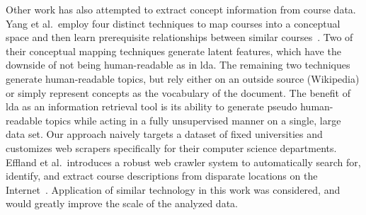 
Other work has also attempted to extract concept information from course data.
Yang et al.\ employ four distinct techniques to map courses into a conceptual space and then learn prerequisite relationships between similar courses~\cite{Yang2015}.
Two of their conceptual mapping techniques generate latent features, which have the downside of not being human-readable as in \ac{lda}.
The remaining two techniques generate human-readable topics, but rely either on an outside source (Wikipedia) or simply represent concepts as the vocabulary of the document.
The benefit of \ac{lda} as an information retrieval tool is its ability to generate pseudo human-readable topics while acting in a fully unsupervised manner on a single, large data set.
Our approach naively targets a dataset of fixed universities and customizes web scrapers specifically for their computer science departments.
Effland et al.\ introduces a robust web crawler system to automatically search for, identify, and extract course descriptions from disparate locations on the Internet~\cite{Effland2015}.
Application of similar technology in this work was considered, and would greatly improve the scale of the analyzed data.


